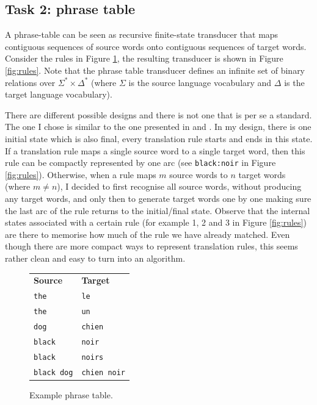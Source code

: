 \subsection{Task 2: phrase table}


A phrase-table can be seen as recursive finite-state transducer that maps contiguous sequences of source words onto contiguous sequences of target words. 
Consider the rules in Figure \ref{fig:table}, the resulting transducer is shown in Figure \ref{fig:rules}. 
Note that the phrase table transducer defines an infinite set of binary relations over $\Sigma^* \times \Delta^*$ (where $\Sigma$ is the source language vocabulary and $\Delta$ is the target language vocabulary).

There are different possible designs and there is not one that is per se a standard.
The one I chose is similar to the one presented in \citep[Figure 6]{Kumar+2003:WFST} and \citep[Figure 1]{Knight+2009:WANLP}.
In my design, there is one initial state which is also final, every translation rule starts and ends in this state.
If a translation rule maps a single source word to a single target word, then this rule can be compactly represented by one arc (see \texttt{black:noir} in Figure \ref{fig:rules}).
Otherwise, when a rule maps $m$ source words to $n$ target words (where $m\neq n$), I decided to first recognise all source words, without producing any target words, and only then to generate target words one by one making sure the last arc of the rule returns to the initial/final state.
Observe that the internal states associated with a certain rule (for example 1, 2 and 3 in Figure \ref{fig:rules}) are there to memorise how much of the rule we have already matched. 
Even though there are more compact ways to represent translation rules, this seems rather clean and easy to turn into an algorithm.


\begin{figure}[h]\centering
\begin{tabular}{l l }
\bf Source & \bf Target \\
\texttt{the} & \texttt{le}  \\
\texttt{the} & \texttt{un} \\
\texttt{dog} & \texttt{chien} \\
\texttt{black} & \texttt{noir} \\
\texttt{black} & \texttt{noirs} \\
\texttt{black dog} & \texttt{chien noir} 
\end{tabular}
\caption{\label{fig:table}Example phrase table.}
\end{figure}


